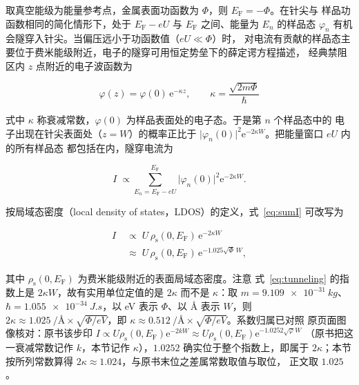 \begin{principle}
取真空能级为能量参考点，金属表面功函数为 $\Phi$，则 $E_{\mathrm{F}}=-\Phi$。在针尖与
样品功函数相同的简化情形下，处于 $E_{\mathrm{F}}-eU$ 与 $E_{\mathrm{F}}$ 之间、能量为
$E_n$ 的样品态 $\varphi_n$ 有机会隧穿入针尖。当偏压远小于功函数值（$eU\ll\Phi$）时，
对电流有贡献的样品态主要位于费米能级附近，电子的隧穿可用恒定势垒下的薛定谔方程描述，
经典禁阻区内 $z$ 点附近的电子波函数为

\begin{equation}
\varphi(z)=\varphi(0)\,\mathrm{e}^{-\kappa z},
\qquad
\kappa=\frac{\sqrt{2m\Phi}}{\hbar}
\label{eq:kappa}
\end{equation}

式中 $\kappa$ 称衰减常数，$\varphi(0)$ 为样品表面处的电子态。于是第 $n$ 个样品态中的
电子出现在针尖表面处（$z=W$）的概率正比于
$\lvert\varphi_n(0)\rvert^{2}\mathrm{e}^{-2\kappa W}$。把能量窗口 $eU$ 内的所有样品态
都包括在内，隧穿电流为

\begin{equation}
I\;\propto\!\!\sum_{E_n=E_{\mathrm{F}}-eU}^{E_{\mathrm{F}}}
\lvert\varphi_n(0)\rvert^{2}\mathrm{e}^{-2\kappa W}.
\label{eq:sumI}
\end{equation}

按局域态密度（local density of states，LDOS）的定义，式~\eqref{eq:sumI} 可改写为

\begin{equation}
\begin{split}
I\;&\propto\;U\,\rho_{\mathrm{s}}(0,E_{\mathrm{F}})\,\mathrm{e}^{-2\kappa W}\\
   &\approx\;U\,\rho_{\mathrm{s}}(0,E_{\mathrm{F}})\,
   \mathrm{e}^{-1.025\sqrt{\Phi}\,W},
\end{split}
\label{eq:tunneling}
\end{equation}

其中 $\rho_{\mathrm{s}}(0,E_{\mathrm{F}})$ 为费米能级附近的表面局域态密度。注意
式~\eqref{eq:tunneling} 的指数上是 $2\kappa W$，故有实用单位定值的是 $2\kappa$ 而不是
$\kappa$：取 $m=\qty{9.109e-31}{kg}$、$\hbar=\qty{1.055e-34}{J.s}$，以 \unit{eV} 表示
$\Phi$、以 \unit{\angstrom} 表示 $W$，则
$2\kappa\approx\qty{1.025}{\per\angstrom}\times\sqrt{\Phi/\unit{eV}}$，即
$\kappa\approx\qty{0.512}{\per\angstrom}\times\sqrt{\Phi/\unit{eV}}$。系数归属已对照
原页面图像核对：原书该步印
$I\propto U\rho_{\mathrm{s}}(0,E_{\mathrm{F}})\mathrm{e}^{-2kW}
\approx U\rho_{\mathrm{s}}(0,E_{\mathrm{F}})\mathrm{e}^{-1.0252\sqrt{\varphi}W}$
（原书把这一衰减常数记作 $k$，本节记作 $\kappa$），$1.0252$ 确实位于整个指数上，即属于
$2\kappa$；本节按所列常数算得 $2\kappa\approx1.024$，与原书末位之差属常数取值与取位，
正文取 $1.025$ 。
\end{principle}

